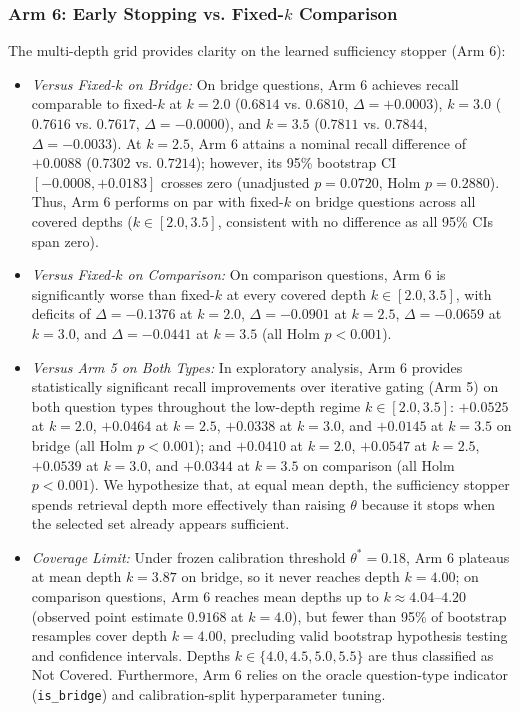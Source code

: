 \documentclass{article}
\begin{document}
\subsubsection{Arm 6: Early Stopping vs. Fixed-$k$ Comparison}
The multi-depth grid provides clarity on the learned sufficiency stopper (Arm 6):
\begin{itemize}
    \item \textit{Versus Fixed-$k$ on Bridge:} On bridge questions, Arm 6 achieves recall comparable to fixed-$k$ at $k=2.0$ ($0.6814$ vs. $0.6810$, $\Delta = +0.0003$), $k=3.0$ ($0.7616$ vs. $0.7617$, $\Delta = -0.0000$), and $k=3.5$ ($0.7811$ vs. $0.7844$, $\Delta = -0.0033$). At $k=2.5$, Arm 6 attains a nominal recall difference of $+0.0088$ ($0.7302$ vs. $0.7214$); however, its 95\% bootstrap CI $[-0.0008, +0.0183]$ crosses zero (unadjusted $p=0.0720$, Holm $p=0.2880$). Thus, Arm 6 performs on par with fixed-$k$ on bridge questions across all covered depths ($k \in [2.0, 3.5]$, consistent with no difference as all 95\% CIs span zero).
    \item \textit{Versus Fixed-$k$ on Comparison:} On comparison questions, Arm 6 is significantly worse than fixed-$k$ at every covered depth $k \in [2.0, 3.5]$, with deficits of $\Delta = -0.1376$ at $k=2.0$, $\Delta = -0.0901$ at $k=2.5$, $\Delta = -0.0659$ at $k=3.0$, and $\Delta = -0.0441$ at $k=3.5$ (all Holm $p < 0.001$).
    \item \textit{Versus Arm 5 on Both Types:} In exploratory analysis, Arm 6 provides statistically significant recall improvements over iterative gating (Arm 5) on both question types throughout the low-depth regime $k \in [2.0, 3.5]$: $+0.0525$ at $k=2.0$, $+0.0464$ at $k=2.5$, $+0.0338$ at $k=3.0$, and $+0.0145$ at $k=3.5$ on bridge (all Holm $p < 0.001$); and $+0.0410$ at $k=2.0$, $+0.0547$ at $k=2.5$, $+0.0539$ at $k=3.0$, and $+0.0344$ at $k=3.5$ on comparison (all Holm $p < 0.001$). We hypothesize that, at equal mean depth, the sufficiency stopper spends retrieval depth more effectively than raising $\theta$ because it stops when the selected set already appears sufficient.
    \item \textit{Coverage Limit:} Under frozen calibration threshold $\theta^*=0.18$, Arm 6 plateaus at mean depth $k=3.87$ on bridge, so it never reaches depth $k=4.00$; on comparison questions, Arm 6 reaches mean depths up to $k \approx 4.04\text{--}4.20$ (observed point estimate $0.9168$ at $k=4.0$), but fewer than 95\% of bootstrap resamples cover depth $k=4.00$, precluding valid bootstrap hypothesis testing and confidence intervals. Depths $k \in \{4.0, 4.5, 5.0, 5.5\}$ are thus classified as Not Covered. Furthermore, Arm 6 relies on the oracle question-type indicator (\texttt{is\_bridge}) and calibration-split hyperparameter tuning.
\end{itemize}
\end{document}
